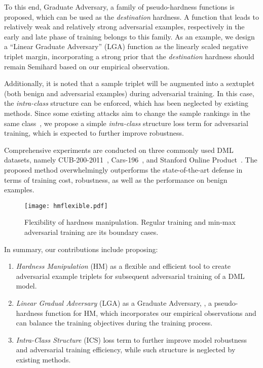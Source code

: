\documentclass[10pt,twocolumn,letterpaper]{article}
\begin{document}

To this end, Graduate Adversary, a family of pseudo-hardness functions is
proposed, which can be used as the \emph{destination} hardness.
%
A function that leads to relatively weak and relatively strong adversarial
examples, respectively in the early and late phase of training belongs to this
family.
%
As an example, we design a ``Linear Graduate Adversary'' (LGA)
function as the linearly scaled negative triplet margin, incorporating a strong
prior that the \emph{destination} hardness should remain Semihard
based on our empirical observation.


Additionally, it is noted that a sample triplet will be augmented into a
sextuplet (both benign and adversarial examples) during adversarial training.
%
In this case, the \emph{intra-class} structure can be enforced, which has been
neglected by existing methods.
%
Since some existing attacks aim to change the sample rankings in the same
class~\cite{advrank},
%
we propose a simple \emph{intra-class} structure loss term for adversarial
training, which is expected to further improve robustness.

Comprehensive experiments are conducted on three commonly used DML datasets,
namely CUB-200-2011~\cite{cub200}, Cars-196~\cite{cars196}, and Stanford Online
Product~\cite{sop}.
%
The proposed method overwhelmingly outperforms the state-of-the-art defense in
terms of training cost, robustness, as well as the performance on benign
examples.

\begin{figure}
	\texttt{[image: hmflexible.pdf]}
	\vspace{-1.8em}
	\caption{Flexibility of hardness manipulation.
	Regular training and min-max adversarial training are its boundary cases.
	}
	\label{fig:hmflexible}
\end{figure}

In summary, our contributions include proposing:
%
\begin{enumerate}[nosep, noitemsep, leftmargin=*]
	\item {\textit{Hardness Manipulation}} (HM) as a flexible and efficient
		tool to create adversarial example triplets for subsequent adversarial
		training of a DML model.
	\item \textit{Linear Gradual Adversary} (LGA) as a Graduate Adversary, \ie,
		a pseudo-hardness function for HM, which incorporates our empirical
		observations and can balance the training objectives during the
		training process.
	\item \textit{Intra-Class Structure} (ICS) loss term to further improve
		model robustness and adversarial training efficiency, while such structure is
		neglected by existing methods. 
\end{enumerate}
\end{document}
